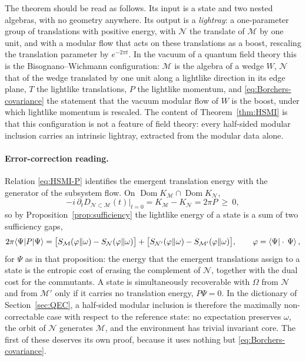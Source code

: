 \documentclass[a4paper,11pt]{article}
\theoremstyle{definition}
\newcommand{\mN}{\mathcal{N}}
\newcommand{\mM}{\mathcal{M}}
\begin{document}
The theorem should be read as follows. Its input is a state and two nested algebras, with no geometry anywhere. Its output is a \emph{lightray}: a one-parameter group of translations with positive energy, with $\mN$ the translate of $\mM$ by one unit, and with a modular flow that acts on these translations as a boost, rescaling the translation parameter by $e^{-2\pi t}$. In the vacuum of a quantum field theory this is the Bisognano--Wichmann configuration: $\mM$ is the algebra of a wedge $W$, $\mN$ that of the wedge translated by one unit along a lightlike direction in its edge plane, $T$ the lightlike translations, $P$ the lightlike momentum, and \eqref{eq:Borchers-covariance} the statement that the vacuum modular flow of $W$ is the boost, under which lightlike momentum is rescaled. The content of Theorem~\ref{thm:HSMI} is that this configuration is not a feature of field theory: every half-sided modular inclusion carries an intrinsic lightray, extracted from the modular data alone.

\paragraph{Error-correction reading.}
Relation \eqref{eq:HSMI-P} identifies the emergent translation energy with the generator of the subsystem flow. On $\operatorname{Dom}K_{\mM}\cap\operatorname{Dom}K_{\mN}$,
\begin{equation}
 -i\,\partial_t D_{\mN\subset\mM}(t)\big|_{t=0}=K_{\mM}-K_{\mN}=2\pi P\ \ge\ 0 ,
 \label{eq:HSMI-generator}
\end{equation}
so by Proposition~\ref{prop:sufficiency} the lightlike energy of a state is a sum of two sufficiency gaps,
\begin{equation}
 2\pi\langle\Psi|P|\Psi\rangle
 =\bigl[S_{\mM}(\varphi\|\omega)-S_{\mN}(\varphi\|\omega)\bigr]
 +\bigl[S_{\mN'}(\varphi\|\omega)-S_{\mM'}(\varphi\|\omega)\bigr],
 \qquad \varphi=\braket{\Psi|\cdot\,\Psi},
 \label{eq:HSMI-energy-gaps}
\end{equation}
for $\Psi$ as in that proposition: the energy that the emergent translations assign to a state is the entropic cost of erasing the complement of $\mN$, together with the dual cost for the commutants. A state is simultaneously recoverable with $\Omega$ from $\mN$ and from $\mM'$ only if it carries no translation energy, $P\Psi=0$. In the dictionary of Section~\ref{sec:QEC}, a half-sided modular inclusion is therefore the maximally non-correctable case with respect to the reference state: no expectation preserves $\omega$, the orbit of $\mN$ generates $\mM$, and the environment has trivial invariant core. The first of these deserves its own proof, because it uses nothing but \eqref{eq:Borchers-covariance}.
\end{document}
